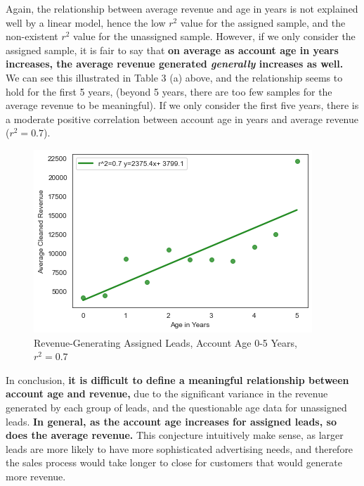 \documentclass[11pt]{article}
\begin{document}
Again, the relationship between average revenue and age in years is not explained well by a linear model, hence the low $r^2$ value for the assigned sample, and the non-existent $r^2$ value for the unassigned sample. However, if we only consider the assigned sample, it is fair to say that \textbf{on average as account age in years increases, the average revenue generated \textit{generally} increases as well.} We can see this illustrated in Table 3 (a) above, and the relationship seems to hold for the first 5 years, (beyond 5 years, there are too few samples for the average revenue to be meaningful). If we only consider the first five years, there is a moderate positive correlation between account age in years and average revenue ($r^2=0.7$). 

\begin{figure}[h!]
    \centering
    \includegraphics[scale=.5]{Images/assigned_regplot_5years.png}
    \caption{Revenue-Generating Assigned Leads, Account Age 0-5 Years, $r^2=0.7$}
    \label{fig:my_label}
\end{figure}

In conclusion, \textbf{it is difficult to define a meaningful relationship between account age and revenue,} due to the significant variance in the revenue generated by each group of leads, and the questionable age data for unassigned leads. \textbf{In general, as the account age increases for assigned leads, so does the average revenue.} This conjecture intuitively make sense, as larger leads are more likely to have more sophisticated advertising needs, and therefore the sales process would take longer to close for customers that would generate more revenue.








\newpage
\end{document}
